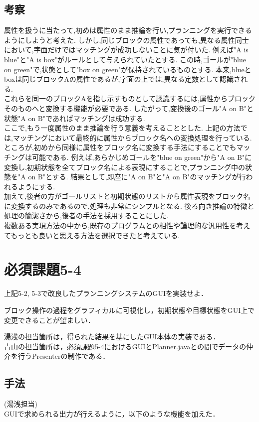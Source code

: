 \documentclass[uplatex,12pt]{jsarticle}
\begin{document}
\subsection{考察}
属性を扱うに当たって,初めは属性のまま推論を行い,プランニングを実行できるようにしようと考えた.
しかし,同じブロックの属性であっても,異なる属性同士において,字面だけではマッチングが成功しないことに気が付いた.
例えば"A is blue"と"A is box"がルールとして与えられていたとする.
この時,ゴールが"blue on green"で,状態として"box on green"が保持されているものとする.
本来,blueとboxは同じブロックAの属性であるが,字面の上では,異なる定数として認識される. \\
これらを同一のブロックAを指し示すものとして認識するには,属性からブロックそのものへと変換する機能が必要である.
したがって,変換後のゴール"A on B"と状態"A on B"であればマッチングは成功する. \\
ここで,もう一度属性のまま推論を行う意義を考えることとした.
上記の方法では,マッチングにおいて最終的に属性からブロック名への変換処理を行っている.
ところが,初めから同様に属性をブロック名に変換する手法にすることでもマッチングは可能である.
例えば,あらかじめゴールを"blue on green"から"A on B"に変換し,初期状態を全てブロック名による表現にすることで,プランニング中の状態を"A on B"とする.
結果として,即座に"A on B"と"A on B"のマッチングが行われるようにする. \\
加えて,後者の方がゴールリストと初期状態のリストから属性表現をブロック名に変換するのみであるので,処理も非常にシンプルとなる.
後ろ向き推論の特徴と処理の簡潔さから,後者の手法を採用することにした. \\
複数ある実現方法の中から,既存のプログラムとの相性や論理的な汎用性を考えてもっとも良いと思える方法を選択できたと考えている.


\section{必須課題5-4}
\begin{screen}
    上記5-2, 5-3で改良したプランニングシステムのGUIを実装せよ．\par
    ブロック操作の過程をグラフィカルに可視化し，初期状態や目標状態をGUI上で変更できることが望ましい．
\end{screen}
湯浅の担当箇所は，得られた結果を基にしたGUI本体の実装である． \\
青山の担当箇所は，必須課題5-4におけるGUIとPlanner.javaとの間でデータの仲介を行うPresenterの制作である．

\subsection{手法}
\noindent (湯浅担当) \\
GUIで求められる出力が行えるように，以下のような機能を加えた．
\end{document}
